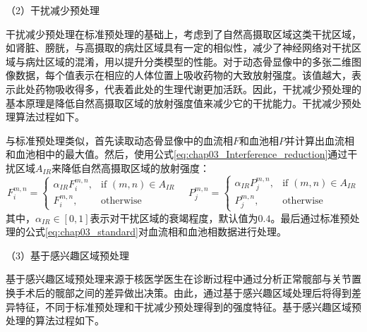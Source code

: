 （2）干扰减少预处理

干扰减少预处理在标准预处理的基础上，考虑到了自然高摄取区域这类干扰区域，如肾脏、膀胱，与高摄取的病灶区域具有一定的相似性，减少了神经网络对干扰区域与病灶区域的混淆，用以提升分类模型的性能。对于动态骨显像中的多张二维图像数据，每个值表示在相应的人体位置上吸收药物的大致放射强度。该值越大，表示此处药物吸收得多，代表着此处的生理代谢更加活跃。因此，干扰减少预处理的基本原理是降低自然高摄取区域的放射强度值来减少它的干扰能力。干扰减少预处理算法过程如下。

与标准预处理类似，首先读取动态骨显像中的血流相\(F\)和血池相\(P\)并计算出血流相和血池相中的最大值。然后，使用公式\ref{eq:chap03_Interference_reduction}通过干扰区域\(A_{IR}\)来降低自然高摄取区域的放射强度：
\begin{equation}
  F_i^{m, n}  =
  \begin{cases}
    \alpha_{IR}F_i^{m, n}, & \text{if \((m,n) \in A_{IR}\)} \\
    F_i^{m, n},            & \text{otherwise}
  \end{cases} \quad
  P_j^{m, n}  =
  \begin{cases}
    \alpha_{IR}P_j^{m, n}, & \text{if \((m,n) \in A_{IR}\)} \\
    P_j^{m, n},            & \text{otherwise}
  \end{cases}
  \label{eq:chap03_Interference_reduction}
\end{equation}
其中，\(\alpha_{IR} \in [0, 1]\)表示对干扰区域的衰竭程度，默认值为\(0.4\)。最后通过标准预处理的公式\ref{eq:chap03_standard}对血流相和血池相数据进行处理。

（3）基于感兴趣区域预处理

基于感兴趣区域预处理来源于核医学医生在诊断过程中通过分析正常髋部与关节置换手术后的髋部之间的差异做出决策。由此，通过基于感兴趣区域处理后将得到差异特征，不同于标准预处理和干扰减少预处理得到的强度特征。基于感兴趣区域预处理的算法过程如下。

